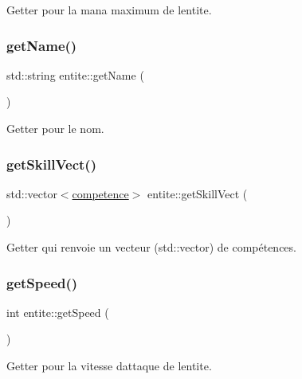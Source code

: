 Getter pour la mana maximum de l\textquotesingle{}entite. 

\mbox{\label{classentite_a0ebd43d682f234a39faa04bb34173d03}} 
\subsubsection{\texorpdfstring{get\+Name()}{getName()}}
{\footnotesize\ttfamily std\+::string entite\+::get\+Name (\begin{DoxyParamCaption}{ }\end{DoxyParamCaption})}



Getter pour le nom. 

\mbox{\label{classentite_a90c927665d7c0b7d6d5202604887e1e2}} 
\subsubsection{\texorpdfstring{get\+Skill\+Vect()}{getSkillVect()}}
{\footnotesize\ttfamily std\+::vector$<$\hyperlink{classcompetence}{competence}$>$ entite\+::get\+Skill\+Vect (\begin{DoxyParamCaption}{ }\end{DoxyParamCaption})}



Getter qui renvoie un vecteur (std\+::vector) de compétences. 

\mbox{\label{classentite_ab97281eadee20e03fe497396439260c9}} 
\subsubsection{\texorpdfstring{get\+Speed()}{getSpeed()}}
{\footnotesize\ttfamily int entite\+::get\+Speed (\begin{DoxyParamCaption}{ }\end{DoxyParamCaption})}



Getter pour la vitesse d\textquotesingle{}attaque de l\textquotesingle{}entite. 

\mbox{\label{classentite_a983d51dcdfaaddaf95096587ea33a3ec}} 
